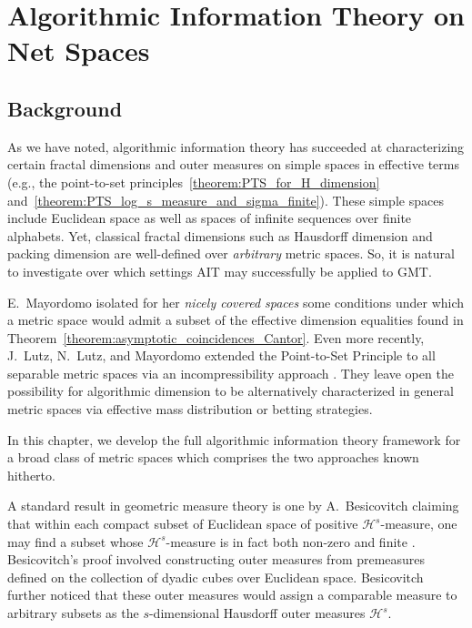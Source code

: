 \chapter[AIT on Net Spaces]{Algorithmic Information Theory on Net Spaces}\label{chapter:AIT_on_Net_Spaces}

\section{Background}
\label{section:Nets_Background}

As we have noted, algorithmic information theory has succeeded at characterizing certain fractal dimensions and outer measures on simple spaces in effective terms (e.g., the point-to-set principles~\ref{theorem:PTS_for_H_dimension} and~\ref{theorem:PTS_log_s_measure_and_sigma_finite}). These simple spaces include Euclidean space as well as spaces of infinite sequences over finite alphabets. Yet, classical fractal dimensions such as Hausdorff dimension and packing dimension are well-defined over \textit{arbitrary} metric spaces. So, it is natural to investigate over which settings AIT may successfully be applied to GMT.

E.~Mayordomo isolated for her \textit{nicely covered spaces} some conditions under which a metric space would admit a subset of the effective dimension equalities found in Theorem~\ref{theorem:asymptotic_coincidences_Cantor}\cite{May14}. Even more recently, J.~Lutz, N.~Lutz, and Mayordomo extended the Point-to-Set Principle to all separable metric spaces via an incompressibility approach \cite{LLM23}. They leave open the possibility for algorithmic dimension to be alternatively characterized in general metric spaces via effective mass distribution or betting strategies. 

In this chapter, we develop the full algorithmic information theory framework for a broad class of metric spaces which comprises the two approaches known hitherto. 

A standard result in geometric measure theory is one by A.~Besicovitch claiming that within each compact subset of Euclidean space of positive $\mathcal{H}^s$-measure, one may find a subset whose $\mathcal{H}^s$-measure is in fact both non-zero and finite \cite{Bes52}. Besicovitch's proof involved constructing outer measures from premeasures defined on the collection of dyadic cubes over Euclidean space. Besicovitch further noticed that these outer measures would assign a comparable measure to arbitrary subsets as the $s$-dimensional Hausdorff outer measures $\mathcal{H}^s$. 

